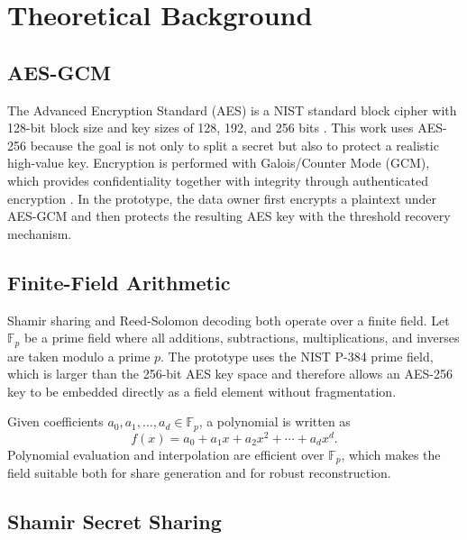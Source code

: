 \section{Theoretical Background}

\subsection{AES-GCM}

The Advanced Encryption Standard (AES) is a NIST standard block cipher with 128-bit block size and key sizes of 128, 192, and 256 bits \cite{fips197}. This work uses AES-256 because the goal is not only to split a secret but also to protect a realistic high-value key. Encryption is performed with Galois/Counter Mode (GCM), which provides confidentiality together with integrity through authenticated encryption \cite{sp80038d}. In the prototype, the data owner first encrypts a plaintext under AES-GCM and then protects the resulting AES key with the threshold recovery mechanism.

\subsection{Finite-Field Arithmetic}

Shamir sharing and Reed-Solomon decoding both operate over a finite field. Let $\mathbb{F}_{p}$ be a prime field where all additions, subtractions, multiplications, and inverses are taken modulo a prime $p$. The prototype uses the NIST P-384 prime field, which is larger than the 256-bit AES key space and therefore allows an AES-256 key to be embedded directly as a field element without fragmentation.

Given coefficients $a_{0}, a_{1}, \ldots, a_{d} \in \mathbb{F}_{p}$, a polynomial is written as
\begin{equation}
f(x) = a_{0} + a_{1}x + a_{2}x^{2} + \cdots + a_{d}x^{d}.
\label{eq:polynomial}
\end{equation}
Polynomial evaluation and interpolation are efficient over $\mathbb{F}_{p}$, which makes the field suitable both for share generation and for robust reconstruction.

\subsection{Shamir Secret Sharing}

